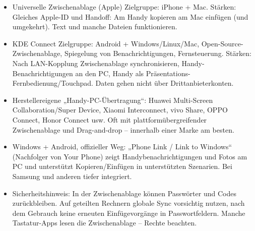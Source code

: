 \begin{itemize}
  \item Universelle Zwischenablage (Apple) Zielgruppe: iPhone + Mac. Stärken: Gleiches Apple-ID und Handoff: Am Handy kopieren am Mac einfügen (und umgekehrt). Text und manche Dateien funktionieren.
  \item KDE Connect Zielgruppe: Android + Windows/Linux/Mac, Open-Source-Zwischenablage, Spiegelung von Benachrichtigungen, Fernsteuerung. Stärken: Nach LAN-Kopplung Zwischenablage synchronisieren, Handy-Benachrichtigungen an den PC, Handy als Präsentations-Fernbedienung/Touchpad. Daten gehen nicht über Drittanbieterkonten.
  \item Herstellereigene „Handy-PC-Übertragung“: Huawei Multi-Screen Collaboration/Super Device, Xiaomi Interconnect, vivo Share, OPPO Connect, Honor Connect usw. Oft mit plattformübergreifender Zwischenablage und Drag-and-drop – innerhalb einer Marke am besten.
  \item Windows + Android, offizieller Weg: „Phone Link / Link to Windows“ (Nachfolger von Your Phone) zeigt Handybenachrichtigungen und Fotos am PC und unterstützt Kopieren/Einfügen in unterstützten Szenarien. Bei Samsung und anderen tiefer integriert.
  \item Sicherheitshinweis: In der Zwischenablage können Passwörter und Codes zurückbleiben. Auf geteilten Rechnern globale Sync vorsichtig nutzen, nach dem Gebrauch keine erneuten Einfügevorgänge in Passwortfeldern. Manche Tastatur-Apps lesen die Zwischenablage – Rechte beachten.
\end{itemize}


